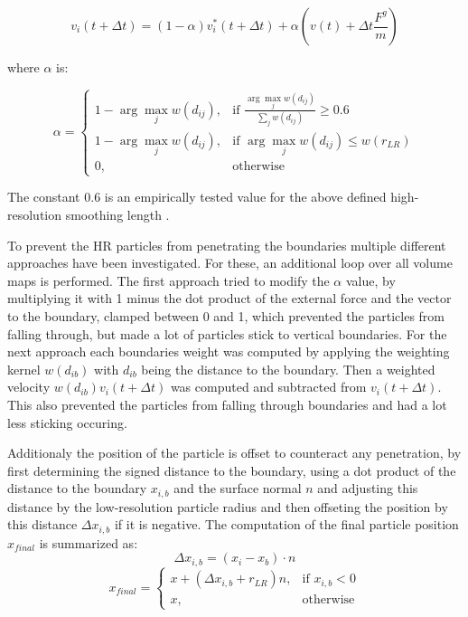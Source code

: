 \documentclass[intern]{cgMA}
\begin{document}
    \begin{equation}
        v_i(t + \Delta t)  = (1 - \alpha)v_i^*(t + \Delta t) + \alpha(v(t) + \Delta t \frac{F^g}{m})
    \end{equation}

    where $\alpha$ is:

    \begin{equation}
        \alpha = 
        \begin{cases}
            1 - \arg \max_j w(d_{ij}),& \text{if } \frac{\arg \max_j w(d_{ij})}{\sum_j w(d_{ij})} \geq 0.6 \\
            1 - \arg \max_j w(d_{ij}),& \text{if } \arg \max_j w(d_{ij}) \leq w(r_{LR}) \\
            0,              & \text{otherwise}
        \end{cases}
    \end{equation}

    The constant $0.6$ is an empirically tested value for the above defined high-resolution smoothing length \cite{10.2312:PE:vriphys:vriphys12:053-060}. 
    
    To prevent the HR particles from penetrating the boundaries multiple different approaches have been investigated. For these, an additional loop over all volume maps is performed. The first approach tried to modify the $\alpha$ value, by multiplying it with 1 minus the dot product of the external force and the vector to the boundary, clamped between 0 and 1, which prevented the particles from falling through, but made a lot of particles stick to vertical boundaries. For the next approach each boundaries weight was computed by applying the weighting kernel $w(d_{ib})$ with $d_{ib}$ being the distance to the boundary. Then a weighted velocity $w(d_{ib}) v_i(t + \Delta t)$ was computed and subtracted from $v_i(t + \Delta t)$. This also prevented the particles from falling through boundaries and had a lot less sticking occuring.

    Additionaly the position of the particle is offset to counteract any penetration, by first determining the signed distance to the boundary, using a dot product of the distance to the boundary $x_{i,b}$ and the surface normal $n$ and adjusting this distance by the low-resolution particle radius and then offseting the position by this distance $\Delta x_{i,b}$ if it is negative. The computation of the final particle position $x_{final}$ is summarized as:
    \begin{equation}
        \Delta x_{i,b} = (x_i - x_b) \cdot n
    \end{equation}
    \begin{equation}
        x_{final} = 
        \begin{cases}
            x + (\Delta x_{i,b} + r_{LR}) n,     & \text{if } x_{i,b} < 0 \\
            x,              & \text{otherwise}
        \end{cases}
    \end{equation}
    
\end{document}
